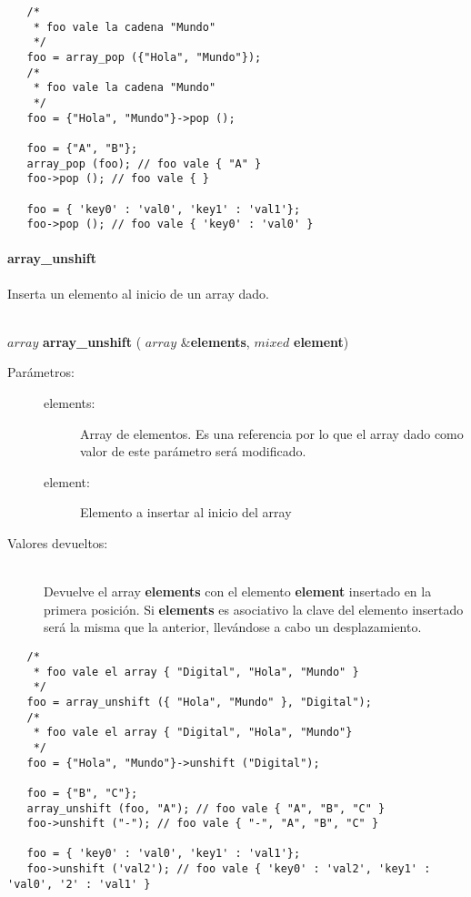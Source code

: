 \begin{lstlisting}   
   /*
    * foo vale la cadena "Mundo"
    */
   foo = array_pop ({"Hola", "Mundo"}); 
   /*
    * foo vale la cadena "Mundo"
    */
   foo = {"Hola", "Mundo"}->pop ();
   
   foo = {"A", "B"};
   array_pop (foo); // foo vale { "A" }
   foo->pop (); // foo vale { }
   
   foo = { 'key0' : 'val0', 'key1' : 'val1'};
   foo->pop (); // foo vale { 'key0' : 'val0' }
\end{lstlisting}


\paragraph{array\_unshift}
Inserta un elemento al inicio de un array dado.

\begin{framed}
\hfill \\ $array$ \textbf{array\_unshift} ( $array$ \&\textbf{elements}, $mixed$ \textbf{element})  
\begin{description}
\item [Parámetros:] \hfill 
   \begin{description}
   \item[elements:] Array de elementos. Es una referencia por lo que el array dado como valor de este parámetro será modificado. 
   \item[element:] Elemento a insertar al inicio del array
   \end{description}
\item[Valores devueltos:] \hfill \\
   Devuelve el array \textbf{elements} con el elemento \textbf{element} insertado en la primera posición. Si \textbf{elements} es
   asociativo la clave del elemento insertado será la misma que la anterior, llevándose a cabo un desplazamiento. 
\end{description}
\end{framed}
     
\begin{lstlisting}   
   /*
    * foo vale el array { "Digital", "Hola", "Mundo" }
    */
   foo = array_unshift ({ "Hola", "Mundo" }, "Digital"); 
   /*
    * foo vale el array { "Digital", "Hola", "Mundo"}
    */
   foo = {"Hola", "Mundo"}->unshift ("Digital");
   
   foo = {"B", "C"};
   array_unshift (foo, "A"); // foo vale { "A", "B", "C" }
   foo->unshift ("-"); // foo vale { "-", "A", "B", "C" }
   
   foo = { 'key0' : 'val0', 'key1' : 'val1'};
   foo->unshift ('val2'); // foo vale { 'key0' : 'val2', 'key1' : 'val0', '2' : 'val1' }
\end{lstlisting}

